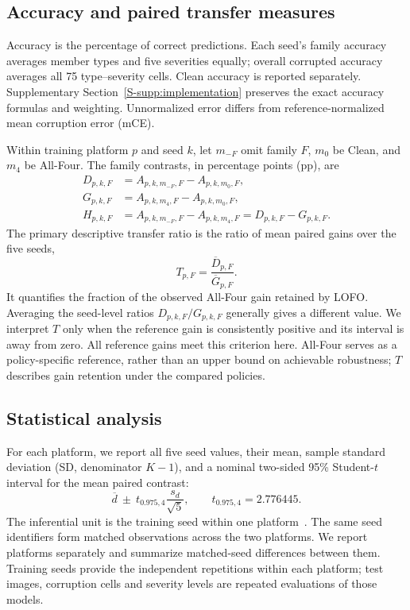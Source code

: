 \documentclass[twoside,a4paper,11pt]{article}
\begin{document}
\subsection{Accuracy and paired transfer measures}
\label{sec:metrics}
Accuracy is the percentage of correct predictions. Each seed's family accuracy averages member types and five severities equally; overall corrupted accuracy averages all 75 type--severity cells. Clean accuracy is reported separately. Supplementary Section~\ref{S-supp:implementation} preserves the exact accuracy formulas and weighting. Unnormalized error differs from reference-normalized mean corruption error (mCE).

Within training platform $p$ and seed $k$, let $m_{-F}$ omit family $F$, $m_0$ be Clean, and $m_4$ be All-Four. The family contrasts, in percentage points (pp), are
\begin{align}
D_{p,k,F}&=A_{p,k,m_{-F},F}-A_{p,k,m_0,F},\\
G_{p,k,F}&=A_{p,k,m_4,F}-A_{p,k,m_0,F},\\
H_{p,k,F}&=A_{p,k,m_{-F},F}-A_{p,k,m_4,F}=D_{p,k,F}-G_{p,k,F}.
\end{align}
The primary descriptive transfer ratio is the ratio of mean paired gains over the five seeds,
\begin{equation}
T_{p,F}=\frac{\overline D_{p,F}}{\overline G_{p,F}}.
\label{eq:transfer}
\end{equation}
It quantifies the fraction of the observed All-Four gain retained by LOFO. Averaging the seed-level ratios $D_{p,k,F}/G_{p,k,F}$ generally gives a different value. We interpret $T$ only when the reference gain is consistently positive and its interval is away from zero. All reference gains meet this criterion here. All-Four serves as a policy-specific reference, rather than an upper bound on achievable robustness; $T$ describes gain retention under the compared policies.

\subsection{Statistical analysis}
\label{sec:statistics}
For each platform, we report all five seed values, their mean, sample standard deviation (SD, denominator $K-1$), and a nominal two-sided 95\% Student-$t$ interval for the mean paired contrast:
\begin{equation}
\overline d\ \pm\ t_{0.975,4}\frac{s_d}{\sqrt5},\qquad t_{0.975,4}=2.776445.
\end{equation}
The inferential unit is the training seed within one platform~\cite{bouthillier2021variance}. The same seed identifiers form matched observations across the two platforms. We report platforms separately and summarize matched-seed differences between them. Training seeds provide the independent repetitions within each platform; test images, corruption cells and severity levels are repeated evaluations of those models.
\end{document}
